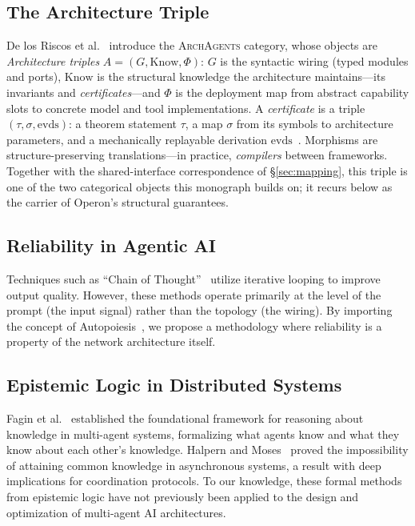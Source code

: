 \subsection{The Architecture Triple}\label{sec:archagents}

De los Riscos et al.~\cite{delosriscos2026categorical} introduce the \textsc{ArchAgents} category, whose objects
are \emph{Architecture triples} $A=(G,\mathrm{Know},\Phi)$: $G$ is the syntactic wiring (typed modules and
ports), $\mathrm{Know}$ is the structural knowledge the architecture maintains---its invariants and
\emph{certificates}---and $\Phi$ is the deployment map from abstract capability slots to concrete model and
tool implementations. A \emph{certificate} is a triple $(\tau,\sigma,\mathrm{evds})$: a theorem statement
$\tau$, a map $\sigma$ from its symbols to architecture parameters, and a mechanically replayable derivation
$\mathrm{evds}$~\cite{banu2026harness}. Morphisms are structure-preserving translations---in practice,
\emph{compilers} between frameworks. Together with the shared-interface correspondence of \S\ref{sec:mapping},
this triple is one of the two categorical objects this monograph builds on; it recurs below as the carrier of
Operon's structural guarantees.

\subsection{Reliability in Agentic AI}

Techniques such as ``Chain of Thought''~\cite{wei2022chain} utilize iterative looping to improve output quality. However, these
methods operate primarily at the level of the prompt (the input signal) rather than the topology (the wiring).
By importing the concept of Autopoiesis~\cite{maturana1980autopoiesis}, we propose a methodology where reliability is a property of the
network architecture itself.

\subsection{Epistemic Logic in Distributed Systems}

Fagin et al.~\cite{fagin1995reasoning} established the foundational framework for reasoning about knowledge in multi-agent systems, formalizing what agents know and what they know about each other's knowledge. Halpern and Moses~\cite{halpern1990knowledge} proved the impossibility of attaining common knowledge in asynchronous systems, a result with deep implications for coordination protocols. To our knowledge, these formal methods from epistemic logic have not previously been applied to the design and optimization of multi-agent AI architectures.

